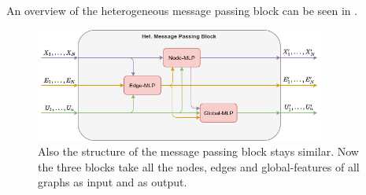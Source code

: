 An overview of the heterogeneous message passing block can be seen in .

\begin{figure}[htp]
    \centering
    \includegraphics[width=0.85\textwidth]{figures/heterogeneous_message_passing_block.png}
    \hspace{1cm}   
    \caption{Also the structure of the message passing block stays similar. Now the three blocks take all the nodes, edges and global-features of all graphs as input and as output.}
    \label{fig:heterogeneous_message_passing_block}
\end{figure}
